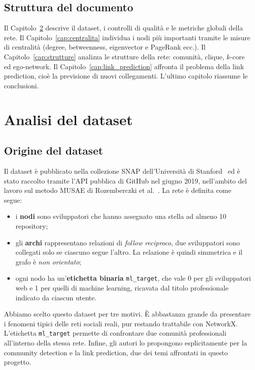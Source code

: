 \documentclass[11pt]{report}
\begin{document}
\section{Struttura del documento}
\label{sec:struttura}
Il Capitolo~\ref{cap:analisi_dataset} descrive il dataset, i controlli di qualità e le metriche globali della rete.
Il Capitolo~\ref{cap:centralita} individua i nodi più importanti tramite le misure di centralità
(degree, betweenness, eigenvector e PageRank ecc.). Il Capitolo~\ref{cap:strutture} analizza le strutture della
rete: comunità, clique, $k$-core ed ego-network. Il Capitolo~\ref{cap:link_prediction} affronta il problema
della link prediction, cioè la previsione di nuovi collegamenti. L'ultimo capitolo riassume le conclusioni.

\chapter{Analisi del dataset}
\label{cap:analisi_dataset}

\section{Origine del dataset}
\label{sec:origine}
Il dataset è pubblicato nella collezione SNAP dell'Università di Stanford~\cite{snapnets} ed è stato
raccolto tramite l'API pubblica di GitHub nel giugno 2019, nell'ambito del lavoro sul metodo MUSAE
di Rozemberczki et al.~\cite{rozemberczki2021musae}. La rete è definita come segue:
\begin{itemize}
  \item i \textbf{nodi} sono sviluppatori che hanno assegnato una stella ad almeno 10 repository;
  \item gli \textbf{archi} rappresentano relazioni di \emph{follow reciproco}, due sviluppatori sono collegati
        solo se ciascuno segue l'altro. La relazione è quindi simmetrica e il grafo è \emph{non orientato};
  \item ogni nodo ha un'\textbf{etichetta binaria} \texttt{ml\_target}, che vale 0 per gli sviluppatori web
        e 1 per quelli di machine learning, ricavata dal titolo professionale indicato da ciascun utente.
\end{itemize}

Abbiamo scelto questo dataset per tre motivi. È abbastanza grande da presentare i fenomeni tipici delle reti
sociali reali, pur restando trattabile con NetworkX. L'etichetta \texttt{ml\_target} permette di confrontare
due comunità professionali all'interno della stessa rete. Infine, gli autori lo propongono esplicitamente per
la community detection e la link prediction, due dei temi affrontati in questo progetto.
\end{document}
